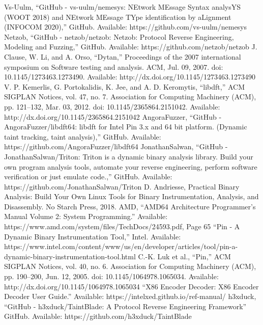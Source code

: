 \documentclass[conference]{IEEEtran}
\begin{document}
\begin{thebibliography}{00}
     Vs-Uulm, “GitHub - vs-uulm/nemesys: NEtwork MEssage Syntax analysYS (WOOT 2018) and NEtwork MEssage TYpe identification by aLignment (INFOCOM 2020),” GitHub. Available: https://github.com/vs-uulm/nemesys
     Netzob, “GitHub - netzob/netzob: Netzob: Protocol Reverse Engineering, Modeling and Fuzzing,” GitHub. Available: https://github.com/netzob/netzob
     J. Clause, W. Li, and A. Orso, “Dytan,” Proceedings of the 2007 international symposium on Software testing and analysis. ACM, Jul. 09, 2007. doi: 10.1145/1273463.1273490. Available: http://dx.doi.org/10.1145/1273463.1273490
     V. P. Kemerlis, G. Portokalidis, K. Jee, and A. D. Keromytis, “libdft,” ACM SIGPLAN Notices, vol. 47, no. 7. Association for Computing Machinery (ACM), pp. 121–132, Mar. 03, 2012. doi: 10.1145/2365864.2151042. Available: http://dx.doi.org/10.1145/2365864.2151042 
     AngoraFuzzer, “GitHub - AngoraFuzzer/libdft64: libdft for Intel Pin 3.x and 64 bit platform. (Dynamic taint tracking, taint analysis),” GitHub. Available: https://github.com/AngoraFuzzer/libdft64
     JonathanSalwan, “GitHub - JonathanSalwan/Triton: Triton is a dynamic binary analysis library. Build your own program analysis tools, automate your reverse engineering, perform software verification or just emulate code.,” GitHub. Available: https://github.com/JonathanSalwan/Triton
     D. Andriesse, Practical Binary Analysis: Build Your Own Linux Tools for Binary Instrumentation, Analysis, and Disassembly. No Starch Press, 2018.
     AMD, “AMD64 Architecture Programmer’s Manual Volume 2: System Programming.” Available: https://www.amd.com/system/files/TechDocs/24593.pdf, Page 65
     “Pin - A Dynamic Binary Instrumentation Tool,” Intel. Available: https://www.intel.com/content/www/us/en/developer/articles/tool/pin-a-dynamic-binary-instrumentation-tool.html
     C.-K. Luk et al., “Pin,” ACM SIGPLAN Notices, vol. 40, no. 6. Association for Computing Machinery (ACM), pp. 190–200, Jun. 12, 2005. doi: 10.1145/1064978.1065034. Available: http://dx.doi.org/10.1145/1064978.1065034
     “X86 Encoder Decoder: X86 Encoder Decoder User Guide.” Available: https://intelxed.github.io/ref-manual/
     h3xduck, “GitHub - h3xduck/TaintBlade: A Protocol Reverse Engineering Framework” GitHub. Available: https://github.com/h3xduck/TaintBlade

\end{thebibliography}
\end{document}
